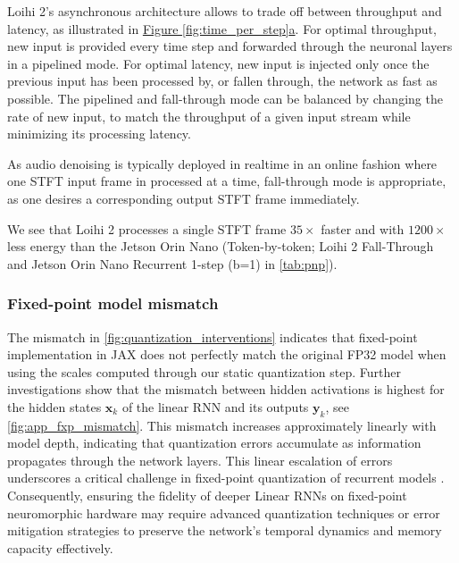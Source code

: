 Loihi 2’s asynchronous architecture allows to trade off between throughput and latency, as illustrated in \hyperref[fig:time_per_step]{Figure \ref{fig:time_per_step}a}. For optimal throughput, new input is provided every time step and forwarded through the neuronal layers in a pipelined mode. For optimal latency, new input is injected only once the previous input has been processed by, or fallen through, the network as fast as possible. The pipelined and fall-through mode can be balanced by changing the rate of new input, to match the throughput of a given input stream while minimizing its processing latency.

As audio denoising is typically deployed in realtime in an online fashion where one STFT input frame in processed at a time, fall-through mode is appropriate, as one desires a corresponding output STFT frame immediately.

We see that Loihi 2 processes a single STFT frame $35\times$ faster and with $1200\times$ less energy than the Jetson Orin Nano (Token-by-token; Loihi 2 Fall-Through and Jetson Orin Nano Recurrent 1-step (b=1) in \autoref{tab:pnp}). 



\subsubsection{Fixed-point model mismatch}
\label{appendix:fxp-sim-mismatch}

The mismatch in \autoref{fig:quantization_interventions} indicates that fixed-point implementation in JAX does not perfectly match the original FP32 model when using the scales computed through our static quantization step. Further investigations show that the mismatch between hidden activations is highest for the hidden states $\mathbf{x}_k$ of the linear RNN and its outputs $\mathbf{y}_k$, see \autoref{fig:app_fxp_mismatch}. 
This mismatch increases approximately linearly with model depth, indicating that quantization errors accumulate as information propagates through the network layers. This linear escalation of errors underscores a critical challenge in fixed-point quantization of recurrent models \cite{wu_googles_2016,abreu2024q,li_quantization_2021,pierro2024mamba}. Consequently, ensuring the fidelity of deeper Linear RNNs on fixed-point neuromorphic hardware may require advanced quantization techniques or error mitigation strategies to preserve the network's temporal dynamics and memory capacity effectively.

